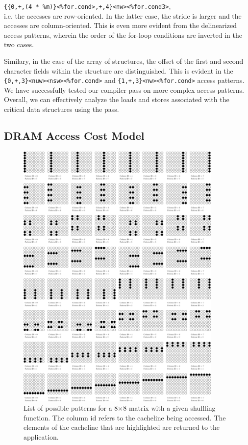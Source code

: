 \documentclass[letterpaper]{article}
\begin{document}
\texttt{\{\{0,+,(4 * \%m)\}<\%for.cond>,+,4\}<nw><\%for.cond3>},\\

i.e. the accesses are row-oriented. In the latter case, the stride is larger and
the accesses are column-oriented. This is even more evident from the delinearized access
patterns, wherein the order of the for-loop conditions are inverted in the
two cases.

Similary, in the case of the array of structures, the offset of the first
and second character fields within the structure are distinguished. This is
evident in the \texttt{\{0,+,3\}<nuw><nsw><\%for.cond>} and
\texttt{\{1,+,3\}<nw><\%for.cond>} access patterns. 
We have successfully tested our compiler pass on more complex access patterns. 
Overall, we can effectively analyze the loads and stores associated with the
critical data structures using the pass.

\subsection{DRAM Access Cost Model}

\begin{figure}[ht!]
	\centering
	\includegraphics[width=0.9\textwidth]{images/pattern}
	\caption{List of possible patterns for a 8$\times$8 matrix with a given
	shuffling function. The column id refers to the cacheline being accessed. 
	The elements of the cacheline that are highlighted are returned to the
	application.}
	\label{fig:pattern}
\end{figure}
\end{document}
